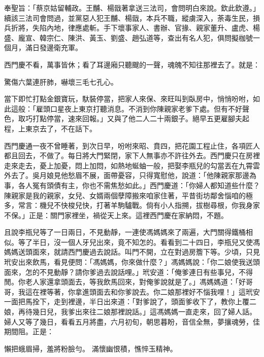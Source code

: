 奉聖旨：「蔡京姑留輔政。王黼、楊戩著拿送三法司，會問明白來說。欽此欽遵。」續該三法司會問過，並黨惡人犯王黼、楊戩，本兵不職，縱虜深入，荼毒生民，損兵折將，失陷內地，律應處斬。手下壞事家人、書辦、官掾、親家董升、盧虎、楊盛、龐宣、韓宗仁、陳洪、黃玉、劉盛、趙弘道等，查出有名人犯，俱問擬枷號一個月，滿日發邊衛充軍。

西門慶不看，萬事皆休；看了耳邊廂只聽颼的一聲，魂魄不知往那裡去了。就是：

驚傷六葉連肝肺，嚇壞三毛七孔心。

當下即忙打點金銀寶玩，馱裝停當，把家人來保、來旺叫到臥房中，悄悄吩咐，如此這般：「雇頭口星夜上東京打聽消息。不消到你陳親家老爹下處。但有不好聲色，取巧打點停當，速來回報。」又與了他二人二十兩銀子。絕早五更雇腳夫起程，上東京去了，不在話下。

西門慶通一夜不曾睡著，到次日早，吩咐來昭、賁四，把花園工程止住，各項匠人都且回去，不做了。每日將大門緊閉，家下人無事亦不許往外去。西門慶只在房裡走來走去，憂上加憂，悶上加悶，如熱地蜒蚰一般，把娶李瓶兒的勾當丟在九霄雲外去了。吳月娘見他愁眉不展，面帶憂容，只得寬慰他，說道：「他陳親家那邊為事，各人冤有頭債有主，你也不需焦愁如此。」西門慶道：「你婦人都知道些什麼？陳親家是我的親家，女兒、女婿兩個孽障搬來咱家住著，平昔街坊鄰舍惱咱的極多，常言：機兒不快梭兒快，打著羊駒驢戰。倘有小人指搠，拔樹尋根，你我身家不保。」正是：關門家裡坐，禍從天上來。這裡西門慶在家納悶，不題。

且說李瓶兒等了一日兩日，不見動靜，一連使馮媽媽來了兩遍，大門關得鐵桶相似。等了半日，沒一個人牙兒出來，竟不知怎的。看看到二十四日，李瓶兒又使馮媽媽送頭面來，就請西門慶過去說話。叫門不開，立在對過房簷下等。少頃，只見玳安出來飲馬，看見便問：「馮媽媽，你來做什麼？」馮媽媽說：「你二娘使我送頭面來，怎的不見動靜？請你爹過去說話哩。」玳安道：「俺爹連日有些事兒，不得閒。你老人家還拿頭面去，等我飲馬回來，對俺爹說就是了。」馮媽媽道：「好哥哥，我這在裡等著，你拿進頭面去和你爹說去。你二娘那裡好不惱我哩！」這玳安一面把馬拴下，走到裡邊，半日出來道：「對爹說了，頭面爹收下了，教你上覆二娘，再待幾日兒，我爹出來往二娘那裡說話。」這馮媽媽一直走來，回了婦人話。婦人又等了幾日，看看五月將盡，六月初旬，朝思暮盼，音信全無，夢攘魂勞，佳期間阻。正是：

懶把蛾眉掃，羞將粉臉勻。
滿懷幽恨積，憔悴玉精神。

